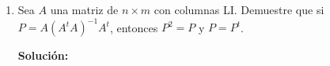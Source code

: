 \documentclass[12pt]{article}
\newenvironment{solucion}
{\begin{mdframed}[backgroundcolor=black!10]
		{\bf Solución:}\\
	}
	{
	\end{mdframed}
}
\newenvironment{preguntas}
{\begin{enumerate}\itemsep12pt
	}
	{
	\end{enumerate}
}
\begin{document}
\begin{preguntas}
\begin{solucion}
$$\begin{bmatrix}
		1 & 0 & 0\\
		0 & 1 & 3\\
		0 & 0 & 1
		\end{bmatrix}, E_6^{-1} = \begin{bmatrix}
		1 & 0 & 6\\
		0 & 1 & 0\\
		0 & 0 & 1
		\end{bmatrix}$$
		Finalmente,
		$$A = \begin{bmatrix}
		1 & 0 & 0\\
		-1 & 1 & 0\\
		0 & 0 & 1
		\end{bmatrix}\begin{bmatrix}
		1 & 0 & 0\\
		0 & 1 & 0\\
		0 & \frac{5}{2} & 1
		\end{bmatrix}\begin{bmatrix}
		1 & 0 & 0\\
		0 & 1 & 0\\
		0 & 0 & \frac{1}{16}
		\end{bmatrix}\begin{bmatrix}
		1 & 0 & 0\\
		0 & -\frac{1}{2} & 0\\
		0 & 0 & 1
		\end{bmatrix}\begin{bmatrix}
		1 & 0 & 0\\
		0 & 1 & 3\\
		0 & 0 & 1
		\end{bmatrix}\begin{bmatrix}
		1 & 0 & 6\\
		0 & 1 & 0\\
		0 & 0 & 1
		\end{bmatrix}$$
\end{solucion}
\item Sea $A$ una matriz de $n\times m$ con columnas LI. Demuestre que si $P=A(A^tA)^{-1}A^{t}$, entonces $P^2=P$ y $P=P^t$.
\begin{solucion}

\end{solucion}
\end{preguntas}
\end{document}
